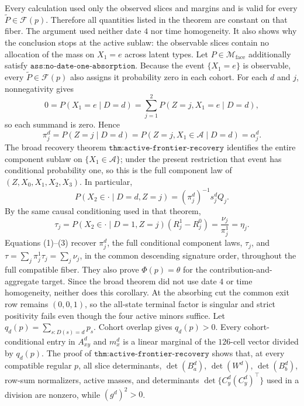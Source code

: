 Every calculation used only the observed slices and margins and is valid for every \(\widetilde P\in\mathcal F(p)\).  Therefore all quantities listed in the theorem are constant on that fiber.  The argument used neither date \(4\) nor time homogeneity.  It also shows why the conclusion stops at the active sublaw: the observable slices contain no allocation of the mass on \(X_1=e\) across latent types.
Let \(P\in\mathcal M_{\mathrm{face}}\) additionally satisfy \(\texttt{ass:no-date-one-absorption}\).  Because the event \(\{X_1=e\}\) is observable, every \(\widetilde P\in\mathcal F(p)\) also assigns it probability zero in each cohort.  For each \(d\) and \(j\), nonnegativity gives
\[
 0=P(X_1=e\mid D=d)=\sum_{j=1}^2P(Z=j,X_1=e\mid D=d),
\]
so each summand is zero.  Hence
\[
 \pi_j^d=P(Z=j\mid D=d)
 =P(Z=j,X_1\in\mathcal A\mid D=d)=\alpha_j^d.               \tag{1}
\]
The broad recovery theorem \(\texttt{thm:active-frontier-recovery}\) identifies the entire component sublaw on \(\{X_1\in\mathcal A\}\); under the present restriction that event has conditional probability one, so this is the full component law of \((Z,X_0,X_1,X_2,X_3)\).  In particular,
\[
 P(X_2\in\cdot\mid D=d,Z=j)
 =(\pi_j^d)^{-1}s_j^dQ_j.                                   \tag{2}
\]
By the same causal conditioning used in that theorem,
\[
 \tau_j
 =P(X_2\in\cdot\mid D=1,Z=j)(R_j^1-R_j^0)
 =\frac{\nu_j}{\pi_j^1}=\eta_j.                            \tag{3}
\]
Equations (1)--(3) recover \(\pi_j^d\), the full conditional component laws, \(\tau_j\), and \(\tau=\sum_j\pi_j^1\tau_j=\sum_j\nu_j\), in the common descending signature order, throughout the full compatible fiber.  They also prove \(\Phi(p)=\theta\) for the contribution-and-aggregate target.  Since the broad theorem did not use date \(4\) or time homogeneity, neither does this corollary.  At the absorbing cut the common exit row remains \((0,0,1)\), so the all-state terminal factor is singular and strict positivity fails even though the four active minors suffice.
Let \(q_d(p)=\sum_{s:D(s)=d}p_s\).  Cohort overlap gives \(q_d(p)>0\).  Every cohort-conditional entry in \(A_{xy}^d\) and \(m_x^d\) is a linear marginal of the \(126\)-cell vector divided by \(q_d(p)\).  The proof of \(\texttt{thm:active-frontier-recovery}\) shows that, at every compatible regular \(p\), all slice determinants, \(\det(B_a^d)\), \(\det(W^d)\), \(\det(B_b^d)\), row-sum normalizers, active masses, and determinants \(\det\{C_y^d(C_y^d)^\top\}\) used in a division are nonzero, while \((g^d)^2>0\).

